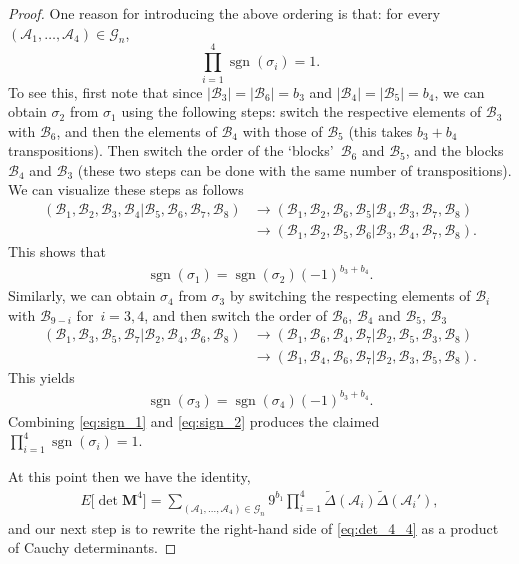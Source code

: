 \documentclass[pdftex]{sigma}
\numberwithin{equation}{section}
\theoremstyle{definition}
\newcommand{\cB}{\mathcal{B}}
\newcommand{\sgn}{\operatorname{sgn}}
\newcommand{\cA}{\mathcal{A}}
\newcommand{\cG}{\mathcal{G}}
\newcommand{\mbf}[1]{\mathbf{#1}}
\newcommand{\wt}[1]{\widetilde{#1}}
\begin{document}
\begin{proof}
One reason for introducing the above ordering is that:
for every $(\cA_1,\dots,\cA_4)\in \cG_n$,
\[
\prod_{i=1}^4 \sgn(\sigma_i)=1.
\]
To see this, first note that since $|\cB_3|=|\cB_6|=b_3$ and $|\cB_4|=|\cB_5|=b_4$, we can obtain $\sigma_2$ from $\sigma_1$ using the following steps: switch the respective elements of $\cB_3$ with $\cB_6$, and then the elements of $\cB_4$ with those of $\cB_5$ (this takes $b_3+b_4$ transpositions). Then switch the order of the `blocks'~$\cB_6$ and $\cB_5$, and the blocks~$\cB_4$ and $\cB_3$ (these two steps can be done with the same number of transpositions). We can visualize these steps as follows
\begin{align*}
 (\cB_1, \cB_2,\cB_3,\cB_4|\cB_5, \cB_6,\cB_7,\cB_8 ) &\to (\cB_1, \cB_2,\cB_6,\cB_5|\cB_4, \cB_3,\cB_7,\cB_8 ) \\
&\to (\cB_1, \cB_2,\cB_5,\cB_6|\cB_3, \cB_4,\cB_7,\cB_8 ).
\end{align*}
This shows that
\begin{align}
 \sgn(\sigma_1)=\sgn(\sigma_2) (-1)^{b_3+b_4}.\label{eq:sign_1}
\end{align}
Similarly, we can obtain $\sigma_4$ from $\sigma_3$ by switching the respecting elements of $\cB_i$ with $\cB_{9-i}$ for~${i=3,4}$, and then switch the order of $\cB_6$, $\cB_4$ and $\cB_5$, $\cB_3$
\begin{align*}
 (\cB_1, \cB_3,\cB_5,\cB_7|\cB_2, \cB_4,\cB_6,\cB_8 )& \to (\cB_1, \cB_6,\cB_4,\cB_7|\cB_2, \cB_5,\cB_3,\cB_8 ) \\
& \to (\cB_1, \cB_4,\cB_6,\cB_7|\cB_2, \cB_3,\cB_5,\cB_8 ).
\end{align*}
This yields
\begin{align}\label{eq:sign_2}
 \sgn(\sigma_3)=\sgn(\sigma_4) (-1)^{b_3+b_4}.
 \end{align}
Combining \eqref{eq:sign_1} and \eqref{eq:sign_2} produces the claimed $\prod_{i=1}^4 \sgn(\sigma_i)=1$.

{\samepage
At this point then we have the identity,
\begin{align}
 \label{eq:det_4_4}
 E\big[ \det \mbf{M}^4\big]=\sum_{(\cA_1,\dots,\cA_4)\in \cG_n} 9^{b_1}
 \prod_{i=1}^4 \wt\Delta(\cA_i)\wt\Delta(\cA_i'),
\end{align}
and our next step is to rewrite the right-hand side of \eqref{eq:det_4_4} as a product of Cauchy determinants.}


\end{proof}
\end{document}
